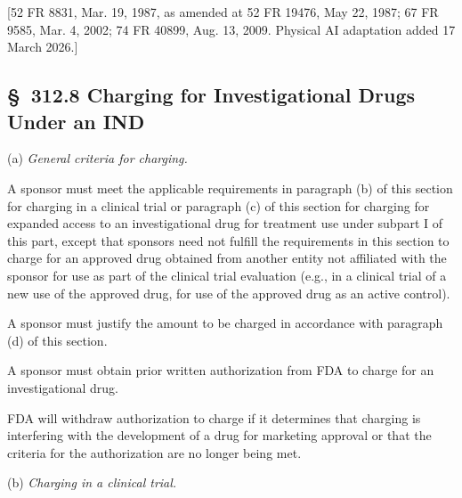 \documentclass[11pt]{article}
\begin{document}
[52 FR 8831, Mar. 19, 1987, as amended at 52 FR 19476, May 22, 1987; 67 FR 9585, Mar. 4, 2002; 74 FR 40899, Aug. 13, 2009. Physical AI adaptation added 17 March 2026.]

\subsection{\S~312.8 Charging for Investigational Drugs Under an IND}

(a) \textit{General criteria for charging.}

\begin{description}[leftmargin=0.5cm,style=sameline]
\item[(1)] A sponsor must meet the applicable requirements in paragraph (b) of this section for charging in a clinical trial or paragraph (c) of this section for charging for expanded access to an investigational drug for treatment use under subpart I of this part, except that sponsors need not fulfill the requirements in this section to charge for an approved drug obtained from another entity not affiliated with the sponsor for use as part of the clinical trial evaluation (e.g., in a clinical trial of a new use of the approved drug, for use of the approved drug as an active control).
\item[(2)] A sponsor must justify the amount to be charged in accordance with paragraph (d) of this section.
\item[(3)] A sponsor must obtain prior written authorization from FDA to charge for an investigational drug.
\item[(4)] FDA will withdraw authorization to charge if it determines that charging is interfering with the development of a drug for marketing approval or that the criteria for the authorization are no longer being met.
\end{description}

(b) \textit{Charging in a clinical trial.}
\end{document}

